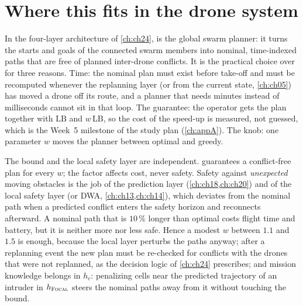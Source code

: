 \section{Where this fits in the drone system}
\label{sec:ch10-drone}

\begin{dronebox}
In the four-layer architecture of \cref{ch:ch24}, \ecbs is the global swarm
planner: it turns the starts and goals of the connected swarm members into
nominal, time-indexed paths that are free of planned inter-drone conflicts.
It is the practical choice over \cbs for three reasons. Time: the nominal
plan must exist before take-off and must be recomputed whenever the
replanning layer (\dstarlite or \astar from the current state,
\cref{ch:ch05}) has moved a drone off its route, and a planner that needs
minutes instead of milliseconds cannot sit in that loop. The guarantee: the
operator gets the plan together with $\mathrm{LB}$ and $w\,\mathrm{LB}$, so
the cost of the speed-up is measured, not guessed, which is the Week~5
milestone of the study plan (\cref{ch:appA}). The knob: one parameter $w$
moves the planner between optimal and greedy.

The bound and the local safety layer are independent. \ecbs guarantees a
conflict-free plan for every $w$; the factor affects cost, never safety.
Safety against \emph{unexpected} moving obstacles is the job of the
prediction layer (\cref{ch:ch18,ch:ch20}) and of the local safety layer
(\orca or DWA, \cref{ch:ch13,ch:ch14}), which deviates from the nominal path
when a predicted conflict enters the safety horizon and reconnects afterward.
A nominal path that is $10\,\%$ longer than optimal costs flight time and
battery, but it is neither more nor less safe. Hence a modest $w$ between
$1.1$ and $1.5$ is enough, because the local layer perturbs the paths anyway;
after a replanning event the new plan must be re-checked for conflicts with
the drones that were not replanned, as the decision logic of \cref{ch:ch24}
prescribes; and mission knowledge belongs in $h_c$: penalizing cells near the
predicted trajectory of an intruder in $h_{\textsc{Focal}}$ steers the nominal
paths away from it without touching the bound.
\end{dronebox}


